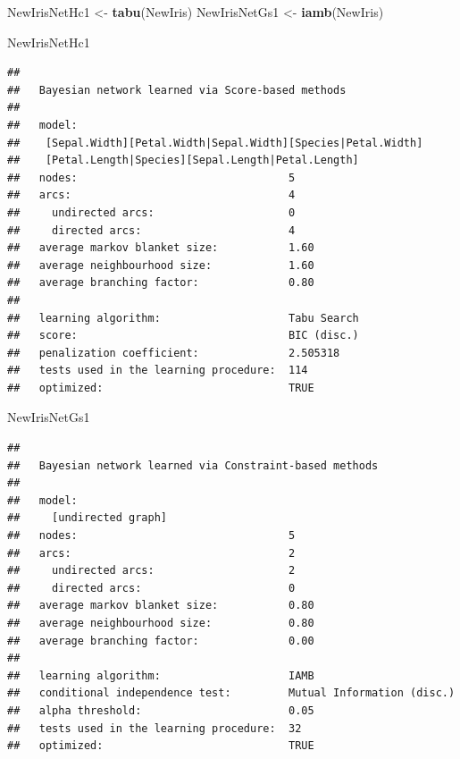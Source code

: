 \documentclass[]{article}
\newenvironment{Shaded}{\begin{snugshade}}{\end{snugshade}}
\newcommand{\KeywordTok}[1]{\textcolor[rgb]{0.13,0.29,0.53}{\textbf{{#1}}}}
\newcommand{\StringTok}[1]{\textcolor[rgb]{0.31,0.60,0.02}{{#1}}}
\newcommand{\NormalTok}[1]{{#1}}
\begin{document}
\begin{Shaded}
\begin{Highlighting}[]
\NormalTok{NewIrisNetHc1 <-}\StringTok{ }\KeywordTok{tabu}\NormalTok{(NewIris)}
\NormalTok{NewIrisNetGs1 <-}\StringTok{ }\KeywordTok{iamb}\NormalTok{(NewIris)}

\NormalTok{NewIrisNetHc1}
\end{Highlighting}
\end{Shaded}

\begin{verbatim}
## 
##   Bayesian network learned via Score-based methods
## 
##   model:
##    [Sepal.Width][Petal.Width|Sepal.Width][Species|Petal.Width]
##    [Petal.Length|Species][Sepal.Length|Petal.Length]
##   nodes:                                 5 
##   arcs:                                  4 
##     undirected arcs:                     0 
##     directed arcs:                       4 
##   average markov blanket size:           1.60 
##   average neighbourhood size:            1.60 
##   average branching factor:              0.80 
## 
##   learning algorithm:                    Tabu Search 
##   score:                                 BIC (disc.) 
##   penalization coefficient:              2.505318 
##   tests used in the learning procedure:  114 
##   optimized:                             TRUE
\end{verbatim}

\begin{Shaded}
\begin{Highlighting}[]
\NormalTok{NewIrisNetGs1}
\end{Highlighting}
\end{Shaded}

\begin{verbatim}
## 
##   Bayesian network learned via Constraint-based methods
## 
##   model:
##     [undirected graph]
##   nodes:                                 5 
##   arcs:                                  2 
##     undirected arcs:                     2 
##     directed arcs:                       0 
##   average markov blanket size:           0.80 
##   average neighbourhood size:            0.80 
##   average branching factor:              0.00 
## 
##   learning algorithm:                    IAMB 
##   conditional independence test:         Mutual Information (disc.) 
##   alpha threshold:                       0.05 
##   tests used in the learning procedure:  32 
##   optimized:                             TRUE
\end{verbatim}
\end{document}
